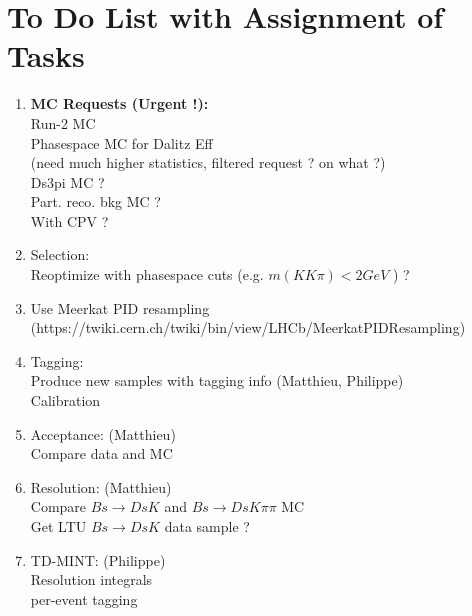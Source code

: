 
\setcounter{section}{-1}
\clearpage

\section{To Do List with Assignment of Tasks}

\begin{enumerate}
	\item \textbf{MC Requests (Urgent !):}
	\\ Run-2 MC 
	\\ Phasespace MC for Dalitz Eff  \\(need much higher statistics, filtered request ? on what ?)
	\\ Ds\to3pi MC ?
	\\ Part. reco. bkg MC ?
	\\ With CPV ?
	\item Selection:
	\\ Reoptimize with phasespace cuts (e.g. $m(KK\pi) < 2 GeV$  ) ?
	\item Use Meerkat PID resampling 
	\\ (https://twiki.cern.ch/twiki/bin/view/LHCb/MeerkatPIDResampling)
	\item Tagging:
	\\ Produce new samples with tagging info (Matthieu, Philippe) 
	\\ Calibration 
	\item Acceptance: (Matthieu) 
	\\ Compare data and MC 
	\item Resolution: (Matthieu) 
	\\ Compare $Bs\to Ds K$ and $Bs\to Ds K \pi \pi$ MC
	\\ Get LTU $Bs\to Ds K$ data sample ?
	\item TD-MINT: (Philippe)  
	\\ Resolution integrals
	\\ per-event tagging
\end{enumerate}





\clearpage

